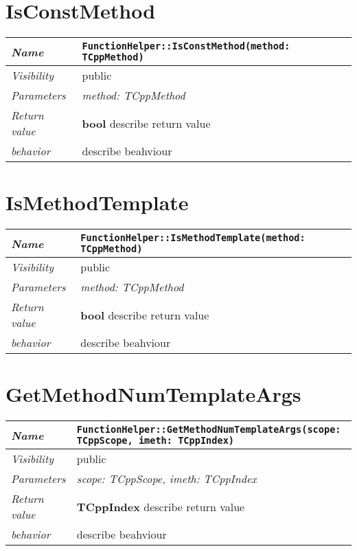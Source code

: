  \section{IsConstMethod}
\begin{longtable}{p{3cm} @{\hskip 1cm} p{12cm}}
 \hline
\textit{Name} & \texttt{FunctionHelper::IsConstMethod(method: TCppMethod)}\\
\hline
 \textit{Visibility} & public\\
\hline
\textit{Parameters} & \textit{method: TCppMethod}\\
\hline
\textit{Return value} & \textbf{ bool} describe return value\\
  \hline
 \textit{behavior} & describe beahviour \\
\hline
\end{longtable} \pagebreak
 \section{IsMethodTemplate}
\begin{longtable}{p{3cm} @{\hskip 1cm} p{12cm}}
 \hline
\textit{Name} & \texttt{FunctionHelper::IsMethodTemplate(method: TCppMethod)}\\
\hline
 \textit{Visibility} & public\\
\hline
\textit{Parameters} & \textit{method: TCppMethod}\\
\hline
\textit{Return value} & \textbf{ bool} describe return value\\
  \hline
 \textit{behavior} & describe beahviour \\
\hline
\end{longtable} \pagebreak
 \section{GetMethodNumTemplateArgs}
\begin{longtable}{p{3cm} @{\hskip 1cm} p{12cm}}
 \hline
\textit{Name} & \texttt{FunctionHelper::GetMethodNumTemplateArgs(scope: TCppScope, imeth: TCppIndex)}\\
\hline
 \textit{Visibility} & public\\
\hline
\textit{Parameters} & \textit{scope: TCppScope, imeth: TCppIndex}\\
\hline
\textit{Return value} & \textbf{ TCppIndex} describe return value\\
  \hline
 \textit{behavior} & describe beahviour \\
\hline
\end{longtable} \pagebreak
